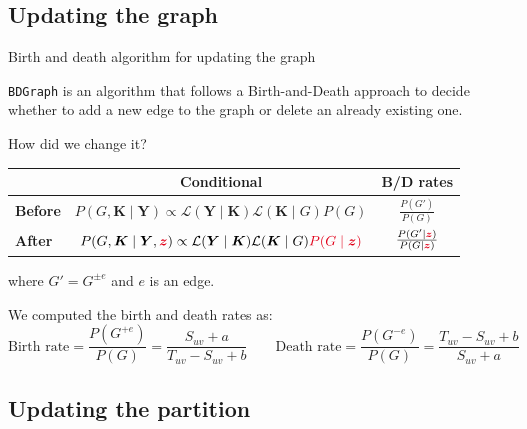 \subsection{Updating the graph}
\begin{frame}{Birth and death algorithm for updating the graph}

    \texttt{BDGraph} is an algorithm that follows a Birth-and-Death approach to decide whether to \alert{add} a new edge to the graph or \alert{delete} an already existing one.

    How did we change it?

    \pause
    
    \begin{table}[tb]
        \centering
        \begin{tabular}{lcc}
        \toprule
        & Conditional & B/D rates \\ %
        \hline
        \textbf{Before} & $P(G,\bm{K} \mid \bm{Y}) \propto \mathcal{L}(\bm{Y} \mid \bm{K})\mathcal{L} (\bm{K} \mid {G})P(G)$ & $\frac{P(G')}{P(G)}$ \\
        \textbf{After}  & $P(G,\bm{K} \mid \bm{Y}, \textcolor{sleekRed}{\bm{z}}) \propto \mathcal{L}(\bm{Y} \mid \bm{K})\mathcal{L}(\bm{K} \mid {G})\textcolor{sleekRed}{P(G \mid \bm{z})}$ & $\frac{P(G' \mid \textcolor{sleekRed}{\bm{z}})}{P(G \mid \textcolor{sleekRed}{\bm{z}})}$ \\
        \bottomrule
        \end{tabular}
    \end{table}
    where $G' = G^{\pm e}$ and $e$ is an edge.

    \pause

    We computed the birth and death rates as:
    \[
        \text{Birth rate} = \frac{P(G^{+ e})}{P(G)} = \frac{S_{uv} + a}{T_{uv} - S_{uv} + b} \qquad \text{Death rate} =\frac{P(G^{- e})}{P(G)} = \frac{T_{uv} - S_{uv} + b}{S_{uv} + a}
    \]
    
\end{frame}


\subsection{Updating the partition}


